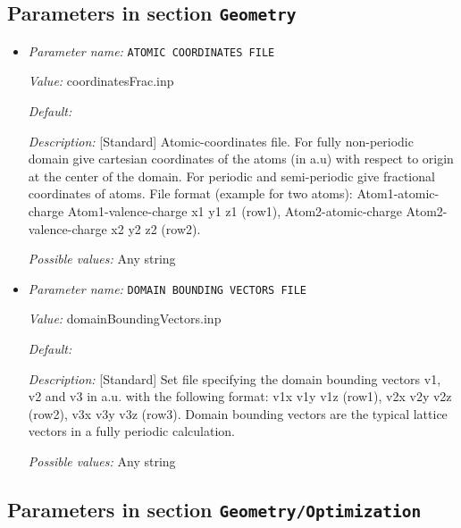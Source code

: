 \subsection{Parameters in section \tt Geometry}
\label{parameters:Geometry}

\begin{itemize}
\item {\it Parameter name:} {\tt ATOMIC COORDINATES FILE}
\label{parameters:Geometry/ATOMIC COORDINATES FILE}
\label{parameters:Geometry/ATOMIC_20COORDINATES_20FILE}


{\it Value:} coordinatesFrac.inp


{\it Default:} 


{\it Description:} [Standard] Atomic-coordinates file. For fully non-periodic domain give cartesian coordinates of the atoms (in a.u) with respect to origin at the center of the domain. For periodic and semi-periodic give fractional coordinates of atoms. File format (example for two atoms): Atom1-atomic-charge Atom1-valence-charge x1 y1 z1 (row1), Atom2-atomic-charge Atom2-valence-charge x2 y2 z2 (row2).


{\it Possible values:} Any string
\item {\it Parameter name:} {\tt DOMAIN BOUNDING VECTORS FILE}
\label{parameters:Geometry/DOMAIN BOUNDING VECTORS FILE}
\label{parameters:Geometry/DOMAIN_20BOUNDING_20VECTORS_20FILE}


{\it Value:} domainBoundingVectors.inp


{\it Default:} 


{\it Description:} [Standard] Set file specifying the domain bounding vectors v1, v2 and v3 in a.u. with the following format: v1x v1y v1z (row1), v2x v2y v2z (row2), v3x v3y v3z (row3). Domain bounding vectors are the typical lattice vectors in a fully periodic calculation.


{\it Possible values:} Any string
\end{itemize}



\subsection{Parameters in section \tt Geometry/Optimization}
\label{parameters:Geometry/Optimization}

